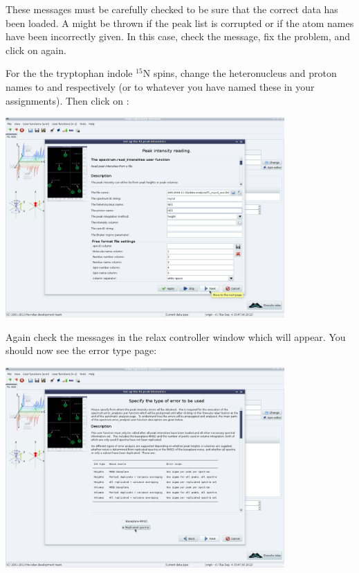 These messages must be carefully checked to be sure that the correct data has been loaded.  A  might be thrown if the peak list is corrupted or if the atom names have been incorrectly given.  In this case, check the message, fix the problem, and click on  again.

For the the tryptophan indole $^{15}$N spins, change the heteronucleus and proton names to  and  respectively (or to whatever you have named these in your assignments).  Then click on :

\begin{minipage}[h]{\linewidth}
\centerline{\includegraphics[width=0.8\textwidth, bb=14 14 1415 1019]{graphics/screenshots/r1_analysis/peak_intensity_trp_peaks}}
\end{minipage}

Again check the messages in the relax controller window which will appear.  You should now see the error type page:

\begin{minipage}[h]{\linewidth}
\centerline{\includegraphics[width=0.8\textwidth, bb=14 14 1415 1019]{graphics/screenshots/r1_analysis/peak_intensity_err_type}}
\end{minipage}

